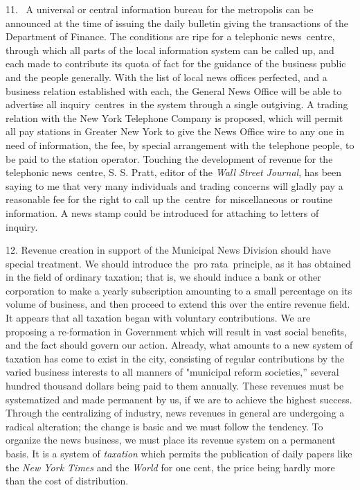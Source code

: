 \documentclass[twoside,symmetric,nobib,justified]{tufte-book}
\begin{document}
11. ~A universal or central information bureau for the metropolis can be
announced at the time of issuing the daily bulletin giving the
transactions of the Department of Finance. The conditions are ripe for a
telephonic news~centre, through which all parts of the local information
system can be called up, and each made to contribute its quota of fact
for the guidance of the business public and the people generally. With
the list of local news offices perfected, and a business relation
established with each, the General News Office will be able to advertise
all inquiry~centres~in the system through a single outgiving. A trading
relation with the New York Telephone Company is proposed, which will
permit all pay stations in Greater New York to give the News Office wire
to any one in need of information, the fee, by special arrangement with
the telephone people, to be paid to the station operator. Touching the
development of revenue for the telephonic news~centre, S. S. Pratt,
editor of the \emph{Wall Street Journal}, has been saying to me that
very many individuals and trading concerns will gladly pay a reasonable
fee for the right to call up the~centre~for miscellaneous or routine
information. A news stamp could be introduced for attaching to letters
of inquiry.~

12. Revenue creation in support of the Municipal News Division should
have special treatment. We should introduce the~pro rata~principle, as
it has obtained in the field of ordinary taxation; that is, we should
induce a bank or other corporation to make a yearly subscription
amounting to a small percentage on its volume of business, and then
proceed to extend this over the entire revenue field. It appears that
all taxation began with voluntary contributions. We are proposing a
re-formation in Government which will result in vast social benefits,
and the fact should govern our action. Already, what amounts to a new
system of taxation has come to exist in the city, consisting of regular
contributions by the varied business interests to all manners of
"municipal reform societies,'' several hundred thousand dollars being
paid to them annually. These revenues must be systematized and made
permanent by us, if we are to achieve the highest success. Through the
centralizing of industry, news revenues in general are undergoing a
radical alteration; the change is basic and we must follow the tendency.
To organize the news business, we must place its revenue system on a
permanent basis. It is a system of \emph{taxation} which permits the
publication of daily papers like the \emph{New York Times} and the
\emph{World} for one cent, the price being hardly more than the cost of
distribution.~
\end{document}
